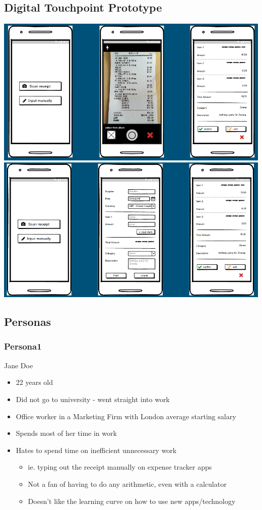 \documentclass[a4wide, 11pt]{article}
\begin{document}
\subsection{Digital Touchpoint Prototype}
\label{dtp}
\includegraphics[width=\textwidth]{DTP1.png}
\includegraphics[width=\textwidth]{DTP2.png}

\subsection{Personas}
\label{persona}
\subsubsection{Persona1}
Jane Doe
\begin{itemize}
  \item 22 years old
  \item Did not go to university - went straight into work
  \item Office worker in a Marketing Firm with London average starting salary
  \item Spends most of her time in work 
  \item Hates to spend time on inefficient unnecessary work
  \begin{itemize}
    \item ie. typing out the receipt manually on expense tracker apps
    \item Not a fan of having to do any arithmetic, even with a calculator
    \item Doesn’t like the learning curve on how to use new apps/technology
  \end{itemize}
\end{itemize}
  
\end{document}
